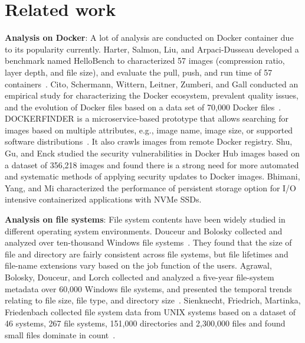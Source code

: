 \section{Related work}
\label{sec:related}

\textbf{Analysis on Docker}:
A lot of analysis are conducted on Docker container due to its popularity currently. 
Harter, Salmon, Liu, and Arpaci-Dusseau developed a benchmark named HelloBench to characterized 57 images (compression ratio, layer depth, and file size), and evaluate the pull, push, and run time of 57 containers~\cite{xxx}.
Cito, Schermann, Wittern, Leitner, Zumberi, and Gall conducted an empirical study for characterizing the Docker ecosystem, prevalent quality issues, and the evolution of Docker files based on a data set of 70,000 Docker files~\cite{xxx}.
DOCKERFINDER is a microservice-based prototype that allows searching for images based on multiple attributes, e.g., image name, image size, or supported software distributions~\cite{xxx}. It also crawls images from remote Docker registry.
Shu, Gu, and Enck studied the security vulnerabilities in Docker Hub images based on a dataset of 356,218 images and found there is a strong need for more automated and systematic methods of applying security updates to Docker images.
Bhimani, Yang, and Mi characterized the performance of persistent storage option for I/O intensive containerized applications with NVMe SSDs.

\textbf{Analysis on file systems}:
File system contents have been widely studied in different operating system environments.
Douceur and Bolosky collected and analyzed over ten-thousand Windows file systems~\cite{xxx}. They found that the size of file and directory are fairly consistent across file systems, but file lifetimes and file-name extensions vary based on the job function of the users. 
Agrawal, Bolosky, Douceur, and Lorch collected and analyzed a five-year file-system metadata over 60,000 Windows file systems, and presented the temporal trends relating to file size, file type, and directory size~\cite{xxx}.
Sienknecht, Friedrich, Martinka, Friedenbach collected file system data from UNIX systems based on a dataset of 46 systems, 267 file systems, 151,000 directories and 2,300,000 files and found small files dominate in count~\cite{xxx}.


